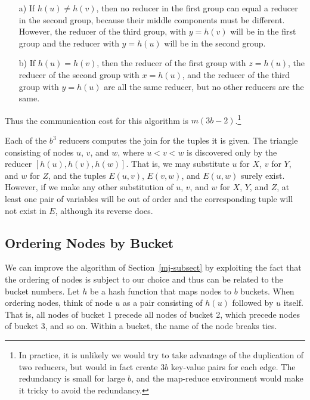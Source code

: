 \begin{itemize}

\item[a)]
If $h(u)\ne h(v)$, then no reducer in the first group can equal a reducer in the second group, because their middle components must be different.  However, the reducer of the third group, with $y=h(v)$ will be in the first group and the reducer with $y=h(u)$ will be in the second group.

\item[b)]
If $h(u)=h(v)$, then the reducer of the first group with $z=h(u)$, the reducer of the second group with $x=h(u)$, and the reducer of the third group with $y=h(u)$ are all the same reducer, but no other reducers are the same.

\end{itemize}
Thus the communication cost for this algorithm is $m(3b-2)$.\footnote{In practice, it is unlikely we would try to take advantage of the duplication of two reducers, but would in fact create $3b$ key-value pairs for each edge.  The redundancy is small for large $b$, and the map-reduce environment would make it tricky to avoid the redundancy.}

Each of the $b^3$ reducers computes the join for the tuples it is given.
The triangle consisting of nodes $u$, $v$, and $w$, where $u<v<w$ is discovered only by the reducer $[h(u),h(v),h(w)]$.  That is, we may substitute $u$ for $X$, $v$ for $Y$, and $w$ for $Z$, and the tuples $E(u,v)$, $E(v,w)$, and $E(u,w)$ surely exist.  However, if we make any other substitution of $u$, $v$, and $w$ for $X$, $Y$, and $Z$, at least one pair of variables will be out of order and the corresponding tuple will not exist in $E$, although its reverse does.

\subsection{Ordering Nodes by Bucket}
\label{improved-subsect}

We can improve the algorithm of Section~\ref{mj-subsect} by exploiting the fact that the ordering of nodes is subject to our choice and thus can be related to the bucket numbers.  Let $h$ be a hash function that maps nodes to $b$ buckets.  When ordering nodes, think of node $u$ as a pair consisting of $h(u)$ followed by $u$ itself.  That is, all nodes of bucket 1 precede all nodes of bucket 2, which precede nodes of bucket 3, and so on.  Within a bucket, the name of the node breaks ties.

